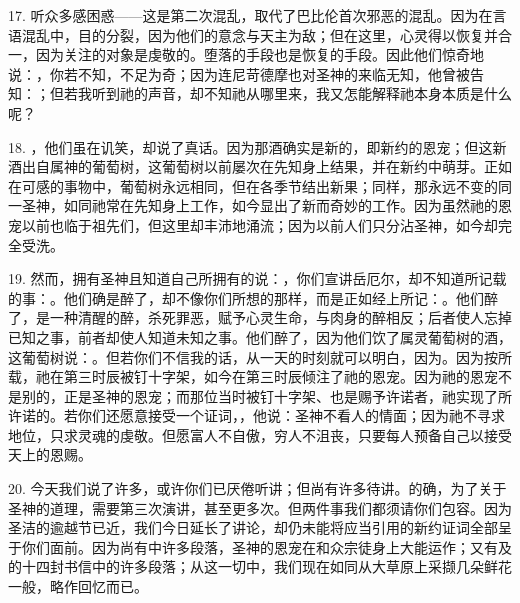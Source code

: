17. 听众多感困惑——这是第二次混乱，取代了巴比伦首次邪恶的混乱。因为在言语混乱中，目的分裂，因为他们的意念与天主为敌；但在这里，心灵得以恢复并合一，因为关注的对象是虔敬的。堕落的手段也是恢复的手段。因此他们惊奇地说：，你若不知，不足为奇；因为连尼苛德摩也对圣神的来临无知，他曾被告知：；但若我听到祂的声音，却不知祂从哪里来，我又怎能解释祂本身本质是什么呢？\par

18. ，他们虽在讥笑，却说了真话。因为那酒确实是新的，即新约的恩宠；但这新酒出自属神的葡萄树，这葡萄树以前屡次在先知身上结果，并在新约中萌芽。正如在可感的事物中，葡萄树永远相同，但在各季节结出新果；同样，那永远不变的同一圣神，如同祂常在先知身上工作，如今显出了新而奇妙的工作。因为虽然祂的恩宠以前也临于祖先们，但这里却丰沛地涌流；因为以前人们只分沾圣神，如今却完全受洗。\par

19. 然而，拥有圣神且知道自己所拥有的说：，你们宣讲岳厄尔，却不知道所记载的事：。他们确是醉了，却不像你们所想的那样，而是正如经上所记：。他们醉了，是一种清醒的醉，杀死罪恶，赋予心灵生命，与肉身的醉相反；后者使人忘掉已知之事，前者却使人知道未知之事。他们醉了，因为他们饮了属灵葡萄树的酒，这葡萄树说：。但若你们不信我的话，从一天的时刻就可以明白，因为。因为按所载，祂在第三时辰被钉十字架，如今在第三时辰倾注了祂的恩宠。因为祂的恩宠不是别的，正是圣神的恩宠；而那位当时被钉十字架、也是赐予许诺者，祂实现了所许诺的。若你们还愿意接受一个证词，，他说：圣神不看人的情面；因为祂不寻求地位，只求灵魂的虔敬。但愿富人不自傲，穷人不沮丧，只要每人预备自己以接受天上的恩赐。\par

20. 今天我们说了许多，或许你们已厌倦听讲；但尚有许多待讲。的确，为了关于圣神的道理，需要第三次演讲，甚至更多次。但两件事我们都须请你们包容。因为圣洁的逾越节已近，我们今日延长了讲论，却仍未能将应当引用的新约证词全部呈于你们面前。因为尚有中许多段落，圣神的恩宠在和众宗徒身上大能运作；又有及的十四封书信中的许多段落；从这一切中，我们现在如同从大草原上采撷几朵鲜花一般，略作回忆而已。\par

